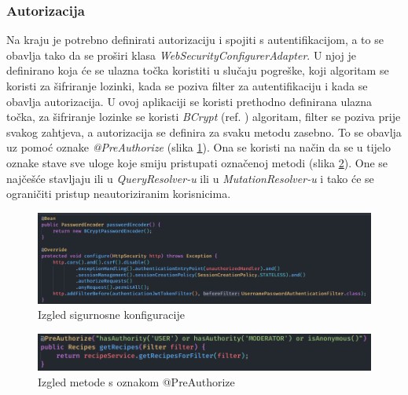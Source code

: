\documentclass[times, utf8, zavrsni]{fer}
\begin{document}
\subsubsection{Autorizacija}
Na kraju je potrebno definirati autorizaciju i spojiti s autentifikacijom, a to se obavlja tako da se
proširi klasa \textit{WebSecurityConfigurerAdapter}.
U njoj je definirano koja će se ulazna točka koristiti u slučaju pogreške, koji algoritam se koristi za šifriranje lozinki,
kada se poziva filter za autentifikaciju i kada se obavlja autorizacija. U ovoj aplikaciji se koristi prethodno
definirana ulazna točka, za šifriranje lozinke se koristi \textit{BCrypt} (ref. \cite{BCrypt}) algoritam, filter se poziva prije svakog zahtjeva, a
autorizacija se definira za svaku metodu zasebno. To se obavlja
uz pomoć oznake \textit{@PreAuthorize} (slika \ref{fig:WebSecurityConfig}).
Ona se koristi na način da se u tijelo oznake stave sve uloge koje smiju pristupati označenoj metodi (slika \ref{fig:PreAuthorize}).
One se najčešće stavljaju ili u \textit{QueryResolver-u} ili u \textit{MutationResolver-u} i tako će se ograničiti pristup
neautoriziranim korisnicima.
\begin{figure}[h]
      \centering
      \includegraphics[width=\textwidth]{WebSecurityConfig.png}
      \caption{Izgled sigurnosne konfiguracije}
      \label{fig:WebSecurityConfig}
\end{figure}
\begin{figure}[h]
      \centering
      \includegraphics[width=\textwidth]{PreAuthorize.png}
      \caption{Izgled metode s oznakom @PreAuthorize}
      \label{fig:PreAuthorize}
\end{figure}
\newpage
\end{document}
